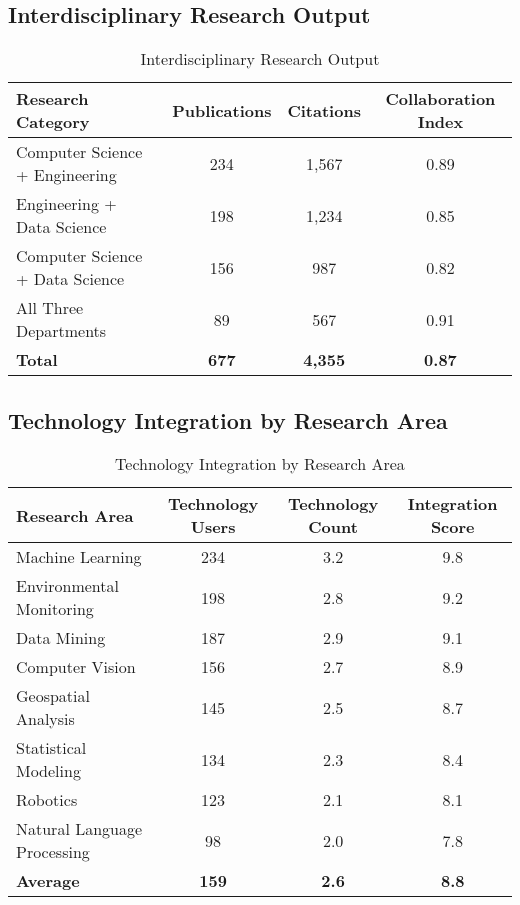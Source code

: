 \documentclass[12pt]{article}
\begin{document}
\subsection{Interdisciplinary Research Output}

\begin{table}[h]
\centering
\caption{Interdisciplinary Research Output}
\label{tab:interdisciplinary_research}
\begin{tabular}{lccc}
\toprule
\textbf{Research Category} & \textbf{Publications} & \textbf{Citations} & \textbf{Collaboration Index} \\
\midrule
Computer Science + Engineering & 234 & 1,567 & 0.89 \\
Engineering + Data Science & 198 & 1,234 & 0.85 \\
Computer Science + Data Science & 156 & 987 & 0.82 \\
All Three Departments & 89 & 567 & 0.91 \\
\midrule
\textbf{Total} & \textbf{677} & \textbf{4,355} & \textbf{0.87} \\
\bottomrule
\end{tabular}
\end{table}

\subsection{Technology Integration by Research Area}

\begin{table}[h]
\centering
\caption{Technology Integration by Research Area}
\label{tab:tech_research_integration}
\begin{tabular}{lccc}
\toprule
\textbf{Research Area} & \textbf{Technology Users} & \textbf{Technology Count} & \textbf{Integration Score} \\
\midrule
Machine Learning & 234 & 3.2 & 9.8 \\
Environmental Monitoring & 198 & 2.8 & 9.2 \\
Data Mining & 187 & 2.9 & 9.1 \\
Computer Vision & 156 & 2.7 & 8.9 \\
Geospatial Analysis & 145 & 2.5 & 8.7 \\
Statistical Modeling & 134 & 2.3 & 8.4 \\
Robotics & 123 & 2.1 & 8.1 \\
Natural Language Processing & 98 & 2.0 & 7.8 \\
\midrule
\textbf{Average} & \textbf{159} & \textbf{2.6} & \textbf{8.8} \\
\bottomrule
\end{tabular}
\end{table}
\end{document}
